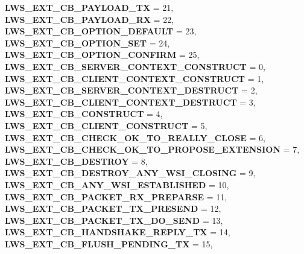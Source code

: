 \begin{DoxyCompactItemize}
{\bfseries L\+W\+S\+\_\+\+E\+X\+T\+\_\+\+C\+B\+\_\+\+P\+A\+Y\+L\+O\+A\+D\+\_\+\+TX} = 21, 
{\bfseries L\+W\+S\+\_\+\+E\+X\+T\+\_\+\+C\+B\+\_\+\+P\+A\+Y\+L\+O\+A\+D\+\_\+\+RX} = 22, 
{\bfseries L\+W\+S\+\_\+\+E\+X\+T\+\_\+\+C\+B\+\_\+\+O\+P\+T\+I\+O\+N\+\_\+\+D\+E\+F\+A\+U\+LT} = 23, 
\newline
{\bfseries L\+W\+S\+\_\+\+E\+X\+T\+\_\+\+C\+B\+\_\+\+O\+P\+T\+I\+O\+N\+\_\+\+S\+ET} = 24, 
{\bfseries L\+W\+S\+\_\+\+E\+X\+T\+\_\+\+C\+B\+\_\+\+O\+P\+T\+I\+O\+N\+\_\+\+C\+O\+N\+F\+I\+RM} = 25, 
{\bfseries L\+W\+S\+\_\+\+E\+X\+T\+\_\+\+C\+B\+\_\+\+S\+E\+R\+V\+E\+R\+\_\+\+C\+O\+N\+T\+E\+X\+T\+\_\+\+C\+O\+N\+S\+T\+R\+U\+CT} = 0, 
{\bfseries L\+W\+S\+\_\+\+E\+X\+T\+\_\+\+C\+B\+\_\+\+C\+L\+I\+E\+N\+T\+\_\+\+C\+O\+N\+T\+E\+X\+T\+\_\+\+C\+O\+N\+S\+T\+R\+U\+CT} = 1, 
\newline
{\bfseries L\+W\+S\+\_\+\+E\+X\+T\+\_\+\+C\+B\+\_\+\+S\+E\+R\+V\+E\+R\+\_\+\+C\+O\+N\+T\+E\+X\+T\+\_\+\+D\+E\+S\+T\+R\+U\+CT} = 2, 
{\bfseries L\+W\+S\+\_\+\+E\+X\+T\+\_\+\+C\+B\+\_\+\+C\+L\+I\+E\+N\+T\+\_\+\+C\+O\+N\+T\+E\+X\+T\+\_\+\+D\+E\+S\+T\+R\+U\+CT} = 3, 
{\bfseries L\+W\+S\+\_\+\+E\+X\+T\+\_\+\+C\+B\+\_\+\+C\+O\+N\+S\+T\+R\+U\+CT} = 4, 
{\bfseries L\+W\+S\+\_\+\+E\+X\+T\+\_\+\+C\+B\+\_\+\+C\+L\+I\+E\+N\+T\+\_\+\+C\+O\+N\+S\+T\+R\+U\+CT} = 5, 
\newline
{\bfseries L\+W\+S\+\_\+\+E\+X\+T\+\_\+\+C\+B\+\_\+\+C\+H\+E\+C\+K\+\_\+\+O\+K\+\_\+\+T\+O\+\_\+\+R\+E\+A\+L\+L\+Y\+\_\+\+C\+L\+O\+SE} = 6, 
{\bfseries L\+W\+S\+\_\+\+E\+X\+T\+\_\+\+C\+B\+\_\+\+C\+H\+E\+C\+K\+\_\+\+O\+K\+\_\+\+T\+O\+\_\+\+P\+R\+O\+P\+O\+S\+E\+\_\+\+E\+X\+T\+E\+N\+S\+I\+ON} = 7, 
{\bfseries L\+W\+S\+\_\+\+E\+X\+T\+\_\+\+C\+B\+\_\+\+D\+E\+S\+T\+R\+OY} = 8, 
{\bfseries L\+W\+S\+\_\+\+E\+X\+T\+\_\+\+C\+B\+\_\+\+D\+E\+S\+T\+R\+O\+Y\+\_\+\+A\+N\+Y\+\_\+\+W\+S\+I\+\_\+\+C\+L\+O\+S\+I\+NG} = 9, 
\newline
{\bfseries L\+W\+S\+\_\+\+E\+X\+T\+\_\+\+C\+B\+\_\+\+A\+N\+Y\+\_\+\+W\+S\+I\+\_\+\+E\+S\+T\+A\+B\+L\+I\+S\+H\+ED} = 10, 
{\bfseries L\+W\+S\+\_\+\+E\+X\+T\+\_\+\+C\+B\+\_\+\+P\+A\+C\+K\+E\+T\+\_\+\+R\+X\+\_\+\+P\+R\+E\+P\+A\+R\+SE} = 11, 
{\bfseries L\+W\+S\+\_\+\+E\+X\+T\+\_\+\+C\+B\+\_\+\+P\+A\+C\+K\+E\+T\+\_\+\+T\+X\+\_\+\+P\+R\+E\+S\+E\+ND} = 12, 
{\bfseries L\+W\+S\+\_\+\+E\+X\+T\+\_\+\+C\+B\+\_\+\+P\+A\+C\+K\+E\+T\+\_\+\+T\+X\+\_\+\+D\+O\+\_\+\+S\+E\+ND} = 13, 
\newline
{\bfseries L\+W\+S\+\_\+\+E\+X\+T\+\_\+\+C\+B\+\_\+\+H\+A\+N\+D\+S\+H\+A\+K\+E\+\_\+\+R\+E\+P\+L\+Y\+\_\+\+TX} = 14, 
{\bfseries L\+W\+S\+\_\+\+E\+X\+T\+\_\+\+C\+B\+\_\+\+F\+L\+U\+S\+H\+\_\+\+P\+E\+N\+D\+I\+N\+G\+\_\+\+TX} = 15, 

\end{DoxyCompactItemize}
